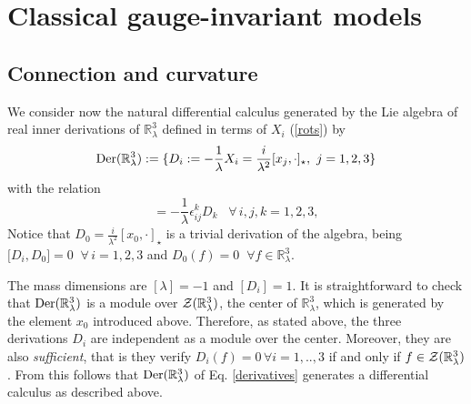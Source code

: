 \documentclass[a4paper,11pt]{article}
\numberwithin{equation}{section}
\newcommand{\eqn}[1]{(\ref{#1})}
\newcommand\Rl{\mathbb{R}^3_\lambda}
\newcommand\DER{{\text{\textup{Der}}}}
\theoremstyle{nonumberplain}
\begin{document}
\section{\texorpdfstring{Classical gauge-invariant models}{Diff calcul next}}\label{section3}
\subsection{Connection and curvature}\label{subsection231}
We consider now the natural differential calculus generated by the Lie algebra of real inner derivations of $\Rl$ defined in terms of $X_i$ \eqn{rots} by
\begin{equation}
\DER(\Rl):=\{D_i:=-\frac{1}{\lambda}X_i =\frac{i}{\lambda^2}[x_j,\cdot]_\star,\ j=1,2,3\}\label{derivatives}
\end{equation}
with the  relation
\begin{equation}
[D_i,D_j]=-\frac{1}{\lambda}\epsilon_{ij}^kD_k\;\;\; \forall\, i,j,k=1,2,3\label{commutderiv}, 
\end{equation}
Notice that $D_0= \frac{i}{\lambda^2}[x_0, \cdot]_\star$ is a trivial derivation of the algebra, being 
${[}D_i, D_0{]}= 0 \;\;\forall\, i=1,2,3$ and $D_0 (f)=0 \;\; \forall f\in \Rl$.  

 The mass dimensions are $[\lambda]=-1$ and $[D_i]=1$. It is straightforward to check that $\DER(\Rl)$ is a module over ${\cal{Z}}(\Rl)$, the center of 
$\Rl$, which is generated by the element $x_0$ introduced above. Therefore, as stated above, the three derivations $D_i$ are independent as a module over the center. Moreover, they are also {\it sufficient}, that is they verify $D_i (f)= 0\, \forall i=1,..,3$ if and only if $f\in {\cal{Z}}(\Rl)$.   From this follows that $\DER(\Rl)$ of Eq. \eqref{derivatives} generates a differential calculus as described above. 
\end{document}
